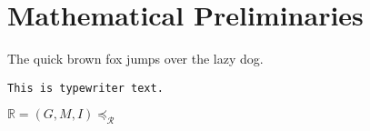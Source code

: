 \chapter{Mathematical Preliminaries}
\label{chapter:mathematical-preliminaries}

The quick brown fox jumps over the lazy dog.

\texttt{This is typewriter text.}

$\mathbb{R} = (G,M,I) \preceq_\mathcal{R}$ 


